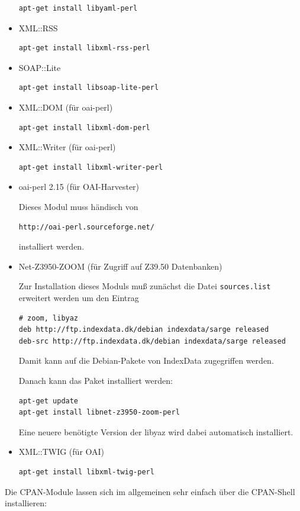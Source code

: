 \documentclass[11pt, twoside, a4paper, BCOR8mm, DIV12, bibtotoc,idxtotoc]{scrbook}
\begin{document}
\begin{itemize}
\begin{verbatim}
apt-get install libyaml-perl
\end{verbatim}
\item XML::RSS
\begin{verbatim}
apt-get install libxml-rss-perl
\end{verbatim}
\item SOAP::Lite
\begin{verbatim}
apt-get install libsoap-lite-perl
\end{verbatim}
\item XML::DOM (für oai-perl)
\begin{verbatim}
apt-get install libxml-dom-perl
\end{verbatim}
\item XML::Writer (für oai-perl)
\begin{verbatim}
apt-get install libxml-writer-perl
\end{verbatim}
\item oai-perl 2.15 (für OAI-Harvester)

Dieses Modul muss händisch von
\begin{verbatim}
http://oai-perl.sourceforge.net/
\end{verbatim}
installiert werden.
\item Net-Z3950-ZOOM (für Zugriff auf Z39.50 Datenbanken) 

Zur Installation dieses Moduls muß zunächst die Datei
  \texttt{sources.list} erweitert werden um den Eintrag
\begin{verbatim}
# zoom, libyaz
deb http://ftp.indexdata.dk/debian indexdata/sarge released
deb-src http://ftp.indexdata.dk/debian indexdata/sarge released
\end{verbatim}

Damit kann auf die Debian-Pakete von IndexData zugegriffen werden.

Danach kann das Paket installiert werden:
\begin{verbatim}
apt-get update
apt-get install libnet-z3950-zoom-perl
\end{verbatim}

Eine neuere benötigte Version der libyaz wird dabei automatisch
installiert.
\item XML::TWIG (für OAI)
\begin{verbatim}
apt-get install libxml-twig-perl
\end{verbatim}
\end{itemize}

Die CPAN-Module lassen sich im allgemeinen sehr einfach über die
CPAN-Shell installieren:
\end{document}

